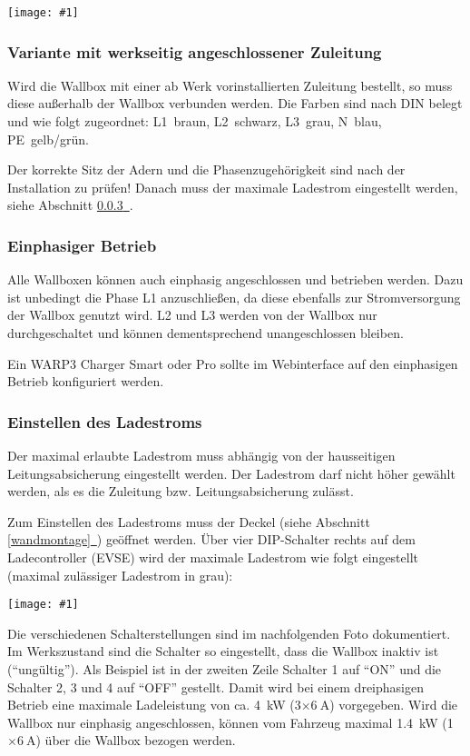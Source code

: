\documentclass[a4paper,10pt]{article}
\newcommand{\hint}[1]{\begin{tcolorbox}[colback=boxgray,colframe=black,coltext=
white,title=Hinweis,left*=2mm,right*=2mm,boxsep=1mm,bottom=1mm,top=1mm]#1\end{tcolorbox}}
\newcommand{\gfx}[1]{\texttt{[image: \#1]}}
\newcommand*{\fullref}[1]{Abschnitt \hyperref[{#1}]{\ref*{#1}~\nameref*{#1}}}
\begin{document}
\begin{multicols*}{2}
    \gfx{./img_warp3/resized/warp3_back.jpg}

    \vspace{-0.01cm}

    \subsubsection{Variante mit werkseitig angeschlossener Zuleitung}
    Wird die Wallbox mit einer ab Werk vorinstallierten Zuleitung bestellt, so
    muss diese außerhalb der Wallbox verbunden werden. Die Farben sind nach DIN belegt und wie
    folgt zugeordnet: L1~braun, L2~schwarz, L3~grau, N~blau, PE~gelb/grün.

    Der korrekte Sitz der Adern und die Phasenzugehörigkeit sind nach der
    Installation zu prüfen!
    Danach muss der maximale Ladestrom eingestellt werden, siehe
	\fullref{ladestrom_schalter}.

    \subsubsection{Einphasiger Betrieb}
    Alle Wallboxen können auch einphasig angeschlossen und betrieben werden.
    Dazu ist unbedingt die Phase L1 anzuschließen, da diese ebenfalls zur
    Stromversorgung der Wallbox genutzt wird. L2 und L3 werden von der Wallbox
    nur durchgeschaltet und können dementsprechend unangeschlossen bleiben.
    \hint{Ein WARP3 Charger Smart oder Pro sollte im Webinterface auf den
    einphasigen Betrieb konfiguriert werden.}

    \subsubsection{Einstellen des Ladestroms}\label{ladestrom_schalter}
    Der maximal erlaubte Ladestrom muss abhängig von der hausseitigen
    Leitungsabsicherung eingestellt werden. Der Ladestrom darf nicht höher gewählt
    werden, als es die Zuleitung bzw. Leitungsabsicherung zulässt.

    Zum Einstellen des Ladestroms muss der Deckel (siehe \fullref{wandmontage})
    geöffnet werden. Über vier DIP-Schalter rechts auf dem Ladecontroller (EVSE) wird der
    maximale Ladestrom wie folgt eingestellt (maximal zulässiger Ladestrom in grau):

    \gfx{./img_warp3/resized/warp3_switch_location.jpg}

    Die verschiedenen Schalterstellungen sind im nachfolgenden Foto dokumentiert.
    Im Werkszustand sind die Schalter so eingestellt, dass die Wallbox inaktiv
	ist (\enquote{ungültig}).
	Als Beispiel ist in der zweiten Zeile Schalter 1 auf \enquote{ON} und die Schalter 2, 3 und 4 auf \enquote{OFF} gestellt.
    Damit wird bei einem dreiphasigen
    Betrieb eine maximale Ladeleistung von ca. \SI{4}{\kilo\watt} (3$\times\SI{6}{\ampere}$) vorgegeben.
    Wird die Wallbox nur einphasig angeschlossen, können vom Fahrzeug maximal
    \SI{1,4}{\kilo\watt} (1$\times\SI{6}{\ampere}$) über die Wallbox bezogen werden.


\end{multicols*}
\end{document}
